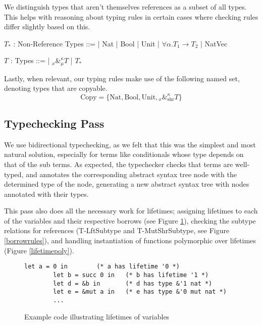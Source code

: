 \documentclass[letterpaper,11pt]{article}
\begin{document}
We distinguish types that aren't themselves references as a subset of all types.
This helps with reasoning about typing rules in certain cases where
checking rules differ slightly based on this.
\begin{center}
    \begin{bnf}
        $T_*$ : \textsf{Non-Reference Types} ::=
        | Nat | Bool | Unit | $\forall\alpha.T_1\rightarrow T_2$ | NatVec
    \end{bnf}
    
    \begin{bnf}
        $T$ : \textsf{Types} ::=
        | ${}_{x}\&^\kappa_\mu T$ | $T_*$
    \end{bnf}
\end{center}

Lastly, when relevant, our typing rules make use of the following named set,
denoting types that are copyable.
$$\text{Copy}=\{\text{Nat}, \text{Bool}, \text{Unit},{}_{x}\&^\kappa_{\text{shr}} T\}$$

\subsection{Typechecking Pass}
We use bidirectional typechecking, as we felt that this was the simplest and
most natural solution, especially for terms like conditionals whose type depends
on that of the sub terms. As expected, the typechecker checks that terms are
well-typed, and annotates the corresponding abstract syntax tree node with
the determined type of the node, generating a new abstract syntax tree with nodes
annotated with their types.

This pass also does all the necessary work for lifetimes; assigning lifetimes
to each of the variables and their respective borrows (see Figure \ref{varlifetimes}), 
checking the subtype relations for references (T-LftSubtype and T-MutShrSubtype, see Figure \ref{borrowrules}), and handling instantiation of functions polymorphic over
lifetimes (Figure \ref{lifetimepoly}). 

\begin{figure}[h]
    \begin{lstlisting}[language=caml]
        let a = 0 in        (* a has lifetime '0 *)
        let b = succ 0 in   (* b has lifetime '1 *)
        let d = &b in       (* d has type &'1 nat *)
        let e = &mut a in   (* e has type &'0 mut nat *)
        ...
    \end{lstlisting}

    \caption{Example code illustrating lifetimes of variables}
    \label{varlifetimes}
\end{figure}
\end{document}
